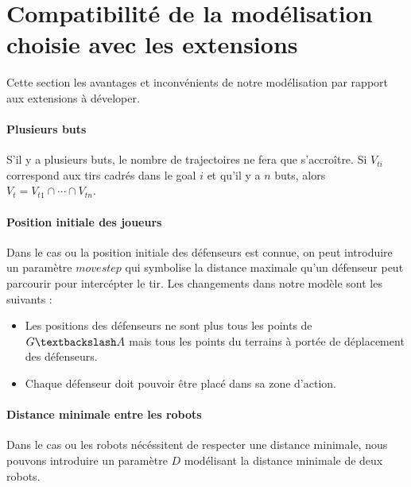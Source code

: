 \documentclass{article}
\begin{document}



\section{Compatibilité de la modélisation choisie avec les extensions}

Cette section les avantages et inconvénients de notre modélisation par rapport aux extensions à déveloper.

\paragraph{Plusieurs buts}
S'il y a plusieurs buts, le nombre de trajectoires ne fera que s'accroître. Si $V_{ti}$ correspond aux tirs cadrés dans le goal $i$ et qu'il y a $n$ buts, alors $V_t = V_{t1} \cap \cdots \cap V_{tn}$.


\paragraph{Position initiale des joueurs}
Dans le cas ou la position initiale des défenseurs est connue, on peut introduire un paramètre $movestep$ qui symbolise la distance maximale qu'un défenseur peut parcourir pour intercépter le tir. Les changements dans notre modèle sont les suivants :

\begin{itemize}
  \item Les positions des défenseurs ne sont plus tous les points de $G \textbackslash A$ mais tous les points du terrains à portée de déplacement des défenseurs.
  \item Chaque défenseur doit pouvoir être placé dans sa zone d'action.
\end{itemize}

\paragraph{Distance minimale entre les robots}
Dans le cas ou les robots nécéssitent de respecter une distance minimale, nous pouvons introduire un paramètre $D$ modélisant la distance minimale de deux robots.
\end{document}
